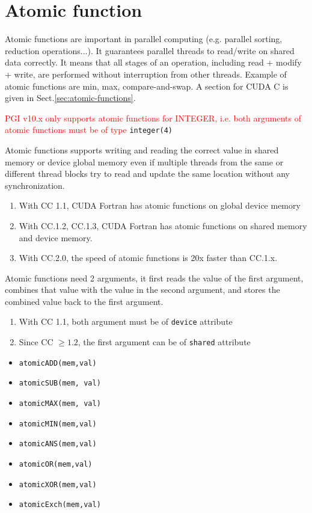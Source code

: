 \section{Atomic function}
\label{sec:atomic-function-fcuda}

Atomic functions are important in parallel computing (e.g. parallel
sorting, reduction operations...). It guarantees parallel threads to
read/write on shared data correctly. It means that all stages of an
operation, including read + modify + write, are performed without
interruption from other threads. Example of atomic functions are min,
max, compare-and-swap. A section for CUDA C is given in
Sect.\ref{sec:atomic-functions}.

\begin{framed}
  \textcolor{red}{PGI v10.x only supports atomic functions for INTEGER,
    i.e. both arguments of atomic functions must be of type}
  \verb.integer(4).
\end{framed}

Atomic functions supports writing and reading the correct value in
shared memory or device global memory even if multiple threads from
the same or different thread blocks try to read and update the same
location without any synchronization.
\begin{enumerate}
\item With CC 1.1, CUDA Fortran has atomic functions on global device
  memory
\item With CC.1.2, CC.1.3, CUDA Fortran has atomic functions on shared
  memory and device memory.
\item With CC.2.0, the speed of atomic functions is 20x faster than
  CC.1.x. 
\end{enumerate}

Atomic functions need 2 arguments, it first reads the value of the
first argument, combines that value with the value in the second
argument, and stores the combined value back to the first argument. 
\begin{enumerate}
\item With CC 1.1, both argument must be of \verb!device! attribute
\item Since CC $\ge 1.2$, the first argument can be of \verb!shared!
  attribute
\end{enumerate}

\begin{itemize}
\item \verb.atomicADD(mem,val).
\item \verb.atomicSUB(mem, val).
\item \verb.atomicMAX(mem, val).
\item \verb.atomicMIN(mem,val).
\item \verb.atomicANS(mem,val).
\item \verb.atomicOR(mem,val).
\item \verb.atomicXOR(mem,val).
\item \verb.atomicExch(mem,val).
\end{itemize}

